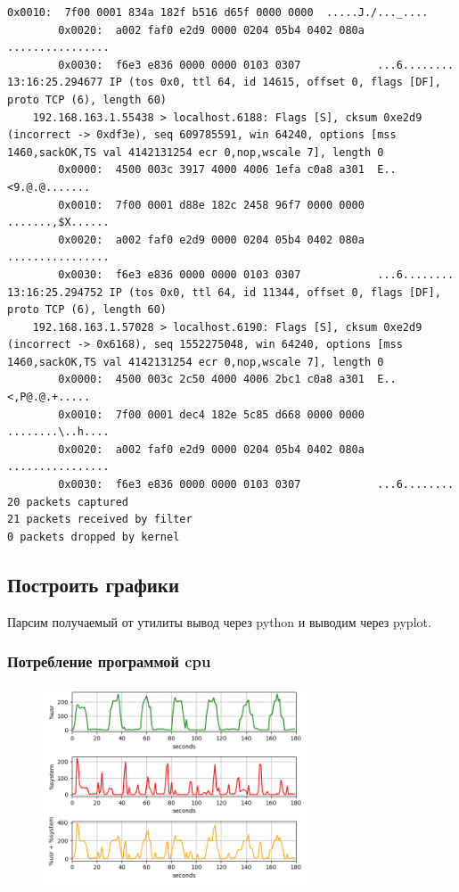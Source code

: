 \documentclass[11pt, a4paper]{article}
\begin{document}
\begin{Verbatim}[fontsize=\footnotesize]
        0x0010:  7f00 0001 834a 182f b516 d65f 0000 0000  .....J./..._....
        0x0020:  a002 faf0 e2d9 0000 0204 05b4 0402 080a  ................
        0x0030:  f6e3 e836 0000 0000 0103 0307            ...6........
13:16:25.294677 IP (tos 0x0, ttl 64, id 14615, offset 0, flags [DF], proto TCP (6), length 60)
    192.168.163.1.55438 > localhost.6188: Flags [S], cksum 0xe2d9 (incorrect -> 0xdf3e), seq 609785591, win 64240, options [mss 1460,sackOK,TS val 4142131254 ecr 0,nop,wscale 7], length 0
        0x0000:  4500 003c 3917 4000 4006 1efa c0a8 a301  E..<9.@.@.......
        0x0010:  7f00 0001 d88e 182c 2458 96f7 0000 0000  .......,$X......
        0x0020:  a002 faf0 e2d9 0000 0204 05b4 0402 080a  ................
        0x0030:  f6e3 e836 0000 0000 0103 0307            ...6........
13:16:25.294752 IP (tos 0x0, ttl 64, id 11344, offset 0, flags [DF], proto TCP (6), length 60)
    192.168.163.1.57028 > localhost.6190: Flags [S], cksum 0xe2d9 (incorrect -> 0x6168), seq 1552275048, win 64240, options [mss 1460,sackOK,TS val 4142131254 ecr 0,nop,wscale 7], length 0
        0x0000:  4500 003c 2c50 4000 4006 2bc1 c0a8 a301  E..<,P@.@.+.....
        0x0010:  7f00 0001 dec4 182e 5c85 d668 0000 0000  ........\..h....
        0x0020:  a002 faf0 e2d9 0000 0204 05b4 0402 080a  ................
        0x0030:  f6e3 e836 0000 0000 0103 0307            ...6........
20 packets captured
21 packets received by filter
0 packets dropped by kernel
\end{Verbatim}

\newpage

\subsection{Построить графики}

\noindent Парсим получаемый от утилиты вывод через python и выводим через pyplot.

\subsubsection*{Потребление программой cpu}

\begin{figure}[h]
  \centering
  \includegraphics[width=0.7\textwidth]{fig-cpu.png}
\end{figure}
\end{document}

